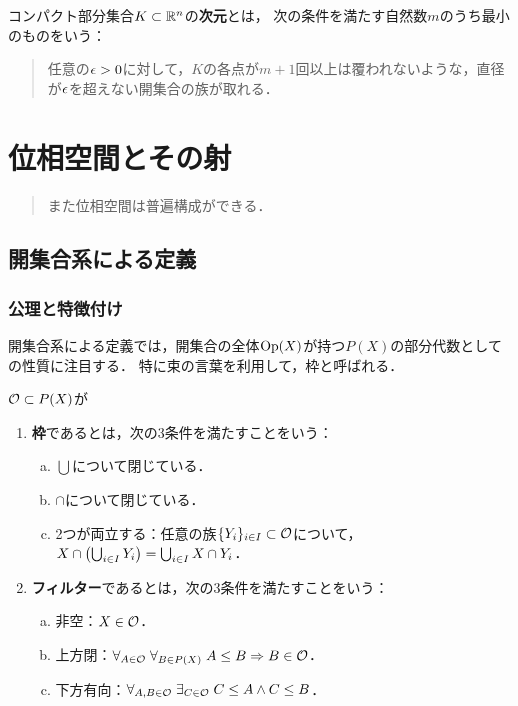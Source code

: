 \documentclass[uplatex,dvipdfmx]{jsreport}
\begin{document}
\begin{definition}
    コンパクト部分集合$K\subset\mathbb{R}^n$の\textbf{次元}とは，
    次の条件を満たす自然数$m$のうち最小のものをいう：
    \begin{quote}
        任意の$\epsilon>0$に対して，$K$の各点が$m+1$回以上は覆われないような，直径が$\epsilon$を超えない開集合の族が取れる．
    \end{quote}
\end{definition}

\chapter{位相空間とその射}

\begin{quotation}
    また位相空間は普遍構成ができる．
\end{quotation}

\section{開集合系による定義}

\subsection{公理と特徴付け}

\begin{tcolorbox}[colframe=ForestGreen, colback=ForestGreen!10!white,breakable,colbacktitle=ForestGreen!40!white,coltitle=black,fonttitle=\bfseries\sffamily,
title=]
    開集合系による定義では，開集合の全体$\mathrm{Op}(X)$が持つ$P(X)$の部分代数としての性質に注目する．
    特に束の言葉を利用して，枠と呼ばれる．
\end{tcolorbox}

\begin{definition}
    $\mathcal{O}\subset P(X)$が
    \begin{enumerate}
        \item \textbf{枠}であるとは，次の3条件を満たすことをいう：
        \begin{enumerate}[(a)]
            \item $\bigcup$について閉じている．
            \item $\cap$について閉じている．
            \item 2つが両立する：任意の族$\{Y_i\}_{i\in I}\subset\mathcal{O}$について，$X\cap\left(\bigcup_{i\in I}Y_i\right)=\bigcup_{i\in I}X\cap Y_i$．
        \end{enumerate}
        \item \textbf{フィルター}であるとは，次の3条件を満たすことをいう：
        \begin{enumerate}[(a)]
            \item 非空：$X\in\mathcal{O}$．
            \item 上方閉：$\forall_{A\in\mathcal{O}}\;\forall_{B\in P(X)}\;A\le B\Rightarrow B\in\mathcal{O}$．
            \item 下方有向：$\forall_{A,B\in\mathcal{O}}\;\exists_{C\in\mathcal{O}}\;C\le A\land C\le B$．
        \end{enumerate}
    \end{enumerate}
\end{definition}
\end{document}
